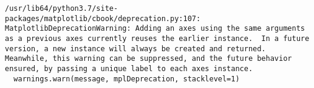 \documentclass[11pt]{article}
\begin{document}
    \begin{Verbatim}[commandchars=\\\{\}]
/usr/lib64/python3.7/site-packages/matplotlib/cbook/deprecation.py:107: MatplotlibDeprecationWarning: Adding an axes using the same arguments as a previous axes currently reuses the earlier instance.  In a future version, a new instance will always be created and returned.  Meanwhile, this warning can be suppressed, and the future behavior ensured, by passing a unique label to each axes instance.
  warnings.warn(message, mplDeprecation, stacklevel=1)

    \end{Verbatim}

    \begin{center}
    \end{center}
    { \hspace*{\fill} \\}
    
\end{document}
